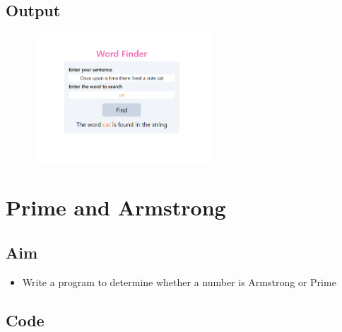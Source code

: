 \documentclass{article}
\begin{document}
\subsection{Output}
\begin{figure}[h!]
	\centering
	\includegraphics[width=0.6\textwidth]{./Assets/p08.png}
\end{figure}
\newpage

\section{Prime and Armstrong}
\subsection{Aim}
\begin{itemize}
	\item Write a program to determine whether a number is Armstrong or Prime
\end{itemize}

\subsection{Code}
\inputminted[frame=lines, linenos, breaklines, breakanywhere, numberblanklines=false]{html}{./prog_9/index.html}
\end{document}
